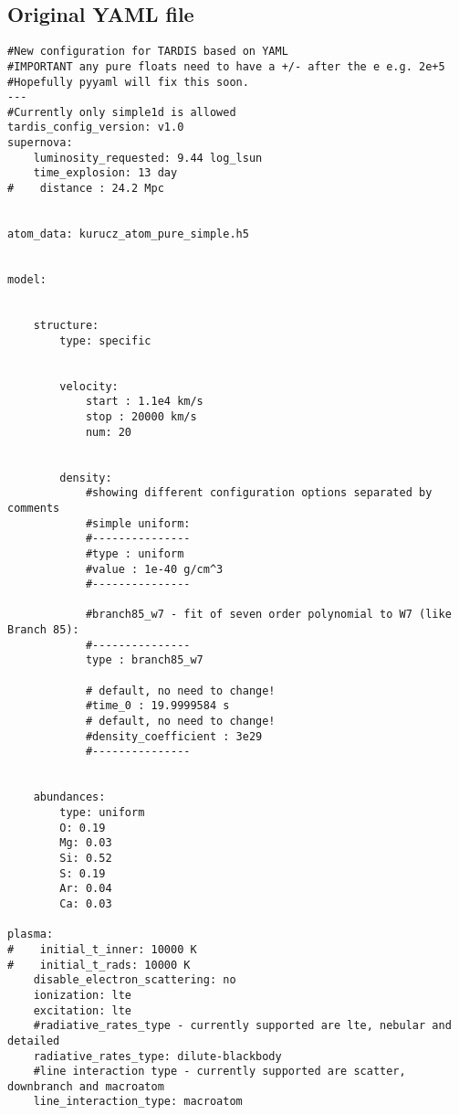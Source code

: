 \documentclass[letterpaper,12pt]{article}
\begin{document}
\clearpage
\begin{appendices}
\section{\label{sec:YAML_file} Original YAML file}


\begin{lstlisting}
#New configuration for TARDIS based on YAML
#IMPORTANT any pure floats need to have a +/- after the e e.g. 2e+5
#Hopefully pyyaml will fix this soon.
---
#Currently only simple1d is allowed
tardis_config_version: v1.0
supernova:
    luminosity_requested: 9.44 log_lsun
    time_explosion: 13 day
#    distance : 24.2 Mpc


atom_data: kurucz_atom_pure_simple.h5


model:
        
    
    structure:
        type: specific


        velocity:
            start : 1.1e4 km/s
            stop : 20000 km/s
            num: 20
        
        
        density:
            #showing different configuration options separated by comments
            #simple uniform:
            #---------------
            #type : uniform
            #value : 1e-40 g/cm^3
            #---------------

            #branch85_w7 - fit of seven order polynomial to W7 (like Branch 85):
            #---------------
            type : branch85_w7
            
            # default, no need to change!
            #time_0 : 19.9999584 s
            # default, no need to change!
            #density_coefficient : 3e29 
            #---------------
                
    
    abundances:
        type: uniform
        O: 0.19
        Mg: 0.03
        Si: 0.52
        S: 0.19
        Ar: 0.04
        Ca: 0.03
                
plasma:
#    initial_t_inner: 10000 K
#    initial_t_rads: 10000 K
    disable_electron_scattering: no
    ionization: lte
    excitation: lte
    #radiative_rates_type - currently supported are lte, nebular and detailed
    radiative_rates_type: dilute-blackbody
    #line interaction type - currently supported are scatter, downbranch and macroatom
    line_interaction_type: macroatom
            


\end{lstlisting}
\end{appendices}
\end{document}
